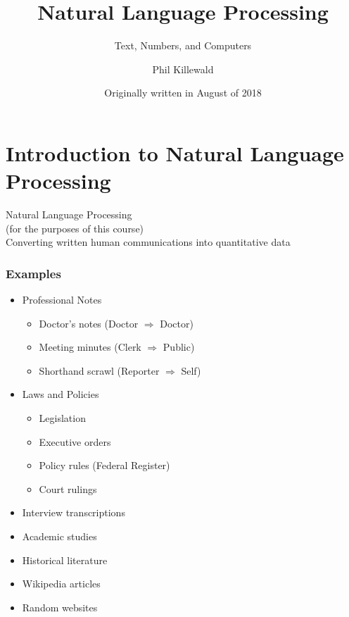 \documentclass[smaller,xcolor=table,aspectratio=169]{beamer}
\title[NLP Course 1]{Natural Language Processing}
\subtitle{Text, Numbers, and Computers}
\author{Phil Killewald}
\date{Originally written in August of 2018}
\begin{document}
{%
\logo{\rule{0pt}{\beamerfootheight}}%
\begin{frame}[noframenumbering]%
\titlepage%
\end{frame}%
}



\section{Introduction to Natural Language Processing}

\begin{frame}[plain]
\begin{centering}
  Natural Language Processing\\
  (for the purposes of this course)\\
  Converting written human communications into quantitative data
\end{centering}
\end{frame}

\begin{frame}
  \frametitle{Examples}
  \begin{itemize}
    \item Professional Notes
    \begin{itemize}
      \item Doctor's notes (Doctor \(\Rightarrow\) Doctor)
      \item Meeting minutes (Clerk \(\Rightarrow\) Public)
      \item Shorthand scrawl (Reporter \(\Rightarrow\) Self)
    \end{itemize}
    \item Laws and Policies
    \begin{itemize}
      \item Legislation
      \item Executive orders
      \item Policy rules (Federal Register)
      \item Court rulings
    \end{itemize}
    \item Interview transcriptions
    \item Academic studies
    \item Historical literature
    \item Wikipedia articles
    \item Random websites
  \end{itemize}
\end{frame}
\end{document}
